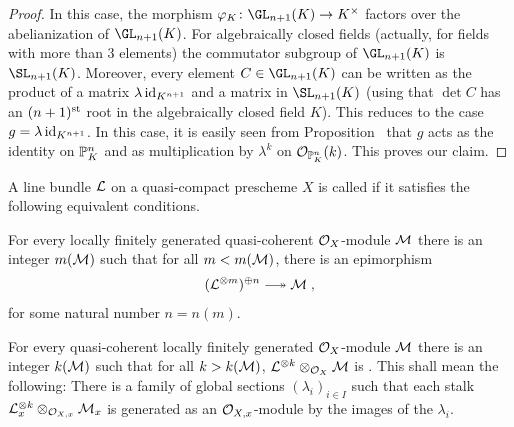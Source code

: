 \documentclass[a4paper,parskip=half,numbers=enddot, DIV=12]{scrreprt}
\begin{document}
\begin{proof}
	In this case, the morphism $\phi_K\colon \GL_{n+1}(K)\morphism K^\times$ factors over the abelianization of $\GL_{n+1}(K)$. For algebraically closed fields (actually, for fields with more than $3$ elements) the commutator subgroup of $\GL_{n+1}(K)$ is $\SL_{n+1}(K)$. Moreover, every element $C\in\GL_{n+1}(K)$ can be written as the product of a matrix $\lambda\operatorname{id}_{K^{n+1}}$ and a matrix in $\SL_{n+1}(K)$ (using that $\det C$ has an $(n+1)^{\text{st}}$ root in the algebraically closed field $K$). This reduces to the case $g=\lambda\operatorname{id}_{K^{n+1}}$. In this case, it is easily seen from Proposition~ that $g$ acts as the identity on $\mathbb{P}_K^n$ and as multiplication by $\lambda^k$ on $\mathcal{O}_{\mathbb{P}_K^n}(k)$. This proves our claim.
\end{proof}
\begin{defi}
	A line bundle $\mathcal{L}$ on a quasi-compact prescheme $X$ is called  if it satisfies the following equivalent conditions.
	\begin{alphanumerate}
		\item For every locally finitely generated quasi-coherent $\mathcal{O}_X$-module $\mathcal{M}$ there is an integer $m(\mathcal{M})$ such that for all $m<m(\mathcal{M})$, there is an epimorphism
		\begin{align*}
		(\Ll^{\otimes m})^{\oplus n}\epimorphism \Mm\;,
		\end{align*}
		for some natural number $n=n(m)$.
		\item For every quasi-coherent locally finitely generated $\mathcal{O}_X$-module $\mathcal{M}$ there is an integer $k(\mathcal{M})$ such that for all $k>k(\mathcal{M})$, $\mathcal{L}^{\otimes k}\otimes_{\mathcal{O}_X}\mathcal{M}$ is . This shall mean the following: There is a family of global sections $(\lambda_i)_{i\in I}$ such that each stalk $\mathcal{L}_x^{\otimes k}\otimes_{\mathcal{O}_{X,x}}\mathcal{M}_x$ is generated as an $\mathcal{O}_{X,x}$-module by the images of the $\lambda_i$.
	\end{alphanumerate}
\end{defi}
\end{document}
